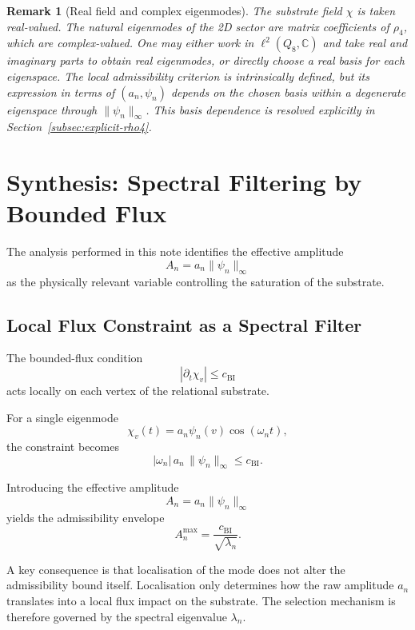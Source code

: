 \documentclass[11pt,a4paper]{article}
\newtheorem{remark}{Remark}
\begin{document}
  \begin{remark}[Real field and complex eigenmodes]
      The substrate field $\chi$ is taken real-valued.
      The natural eigenmodes of the 2D sector are matrix coefficients of $\rho_4$,
      which are complex-valued.
      One may either work in $\ell^2(Q_8,\mathbb{C})$ and take real and imaginary parts to
      obtain real eigenmodes, or directly choose a real basis for each eigenspace.
      The local admissibility criterion is intrinsically defined, but its expression in
      terms of $(a_n,\psi_n)$ depends on the chosen basis within a degenerate eigenspace
      through $\|\psi_n\|_\infty$.
      This basis dependence is resolved explicitly in
      Section~\ref{subsec:explicit-rho4}.
  \end{remark}
\section{Synthesis: Spectral Filtering by Bounded Flux}
  \label{sec:synthesis-spectral-filtering-by-bounded-flux}

  The analysis performed in this note identifies the effective amplitude
  \[
    A_n = a_n \|\psi_n\|_\infty
  \]
  as the physically relevant variable controlling the saturation of the
  substrate.

  \subsection{Local Flux Constraint as a Spectral Filter}

    The bounded-flux condition
    \[
      |\partial_t \chi_v| \le c_{\mathrm{BI}}
    \]
    acts locally on each vertex of the relational substrate.

    For a single eigenmode
    \[
      \chi_v(t) = a_n \psi_n(v) \cos(\omega_n t),
    \]
    the constraint becomes
    \[
      |\omega_n|\,a_n\,\|\psi_n\|_\infty \le c_{\mathrm{BI}}.
    \]

    Introducing the effective amplitude
    \[
      A_n = a_n \|\psi_n\|_\infty
    \]
    yields the admissibility envelope
    \[
      A_n^{\max} = \frac{c_{\mathrm{BI}}}{\sqrt{\lambda_n}}.
    \]

    A key consequence is that localisation of the mode does not alter the
    admissibility bound itself.
    Localisation only determines how the raw amplitude $a_n$ translates into
    a local flux impact on the substrate.
    The selection mechanism is therefore governed by the spectral
    eigenvalue $\lambda_n$.
\end{document}
